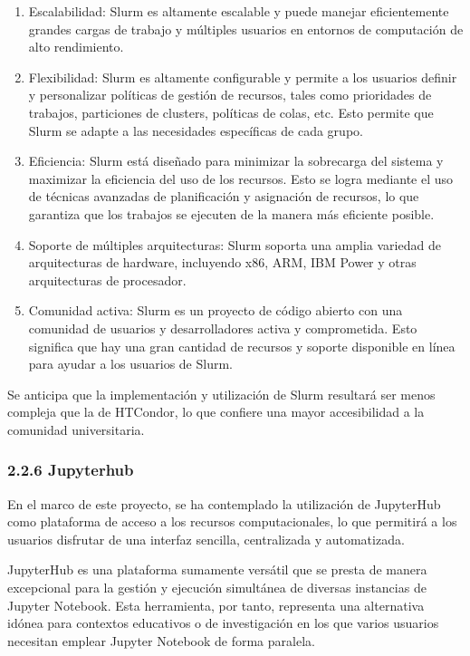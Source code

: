 \begin{spacing}{1.5}
    \begin{enumerate}
      \item Escalabilidad: Slurm es altamente escalable y puede manejar eficientemente grandes cargas de trabajo y múltiples usuarios en entornos de computación de alto rendimiento.
      \item Flexibilidad: Slurm es altamente configurable y permite a los usuarios definir y personalizar políticas de gestión de recursos, tales como prioridades de trabajos, particiones de clusters, políticas de colas, etc. Esto permite que Slurm se adapte a las necesidades específicas de cada grupo.
      \item Eficiencia: Slurm está diseñado para minimizar la sobrecarga del sistema y maximizar la eficiencia del uso de los recursos. Esto se logra mediante el uso de técnicas avanzadas de planificación y asignación de recursos, lo que garantiza que los trabajos se ejecuten de la manera más eficiente posible.
      \item Soporte de múltiples arquitecturas: Slurm soporta una amplia variedad de arquitecturas de hardware, incluyendo x86, ARM, IBM Power y otras arquitecturas de procesador.
      \item Comunidad activa: Slurm es un proyecto de código abierto con una comunidad de usuarios y desarrolladores activa y comprometida. Esto significa que hay una gran cantidad de recursos y soporte disponible en línea para ayudar a los usuarios de Slurm.
    \end{enumerate}

    Se anticipa que la implementación y utilización de Slurm resultará ser menos compleja que la de HTCondor, lo que confiere una mayor accesibilidad a la comunidad universitaria. \cite{RHEL-SLURM-1}

    \subsubsection{2.2.6 Jupyterhub}

    En el marco de este proyecto, se ha contemplado la utilización de JupyterHub como plataforma de acceso a los recursos computacionales, lo que permitirá a los usuarios disfrutar de una interfaz sencilla, centralizada y automatizada.

    JupyterHub es una plataforma sumamente versátil que se presta de manera excepcional para la gestión y ejecución simultánea de diversas instancias de Jupyter Notebook. Esta herramienta, por tanto, representa una alternativa idónea para contextos educativos o de investigación en los que varios usuarios necesitan emplear Jupyter Notebook de forma paralela.


\end{spacing}
